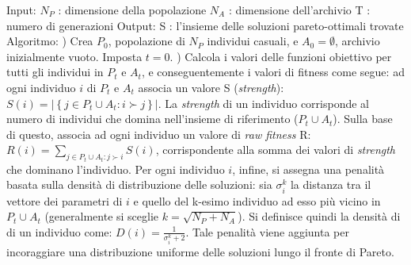 \documentclass[12pt]{article}
\begin{document}
Input: \newline
\tab \tab$ N_P$ : dimensione della popolazione \newline
\tab \tab $N_A$ : dimensione dell'archivio \newline
\tab \tab T : numero di generazioni \newline
\newline
Output: \newline
\tab \tab S : l'insieme delle soluzioni pareto-ottimali trovate \newline
\newline
Algoritmo:\newline
\tab {}) Crea $P_0$, popolazione di $N_P$ individui casuali, e $A_0 = \emptyset$, archivio inizialmente vuoto. Imposta $t = 0$.\newline
\tab {}) Calcola i valori delle funzioni obiettivo per tutti gli individui in $P_t$ e $A_t$, e conseguentemente i valori di fitness come segue: \newline
ad ogni individuo $i$ di $P_t$ e $A_t$ associa un valore S (\textit{strength}): \newline
\newline
 $S(i) = |\left\{ j \in P_t \cup A_t : i \succ j \right\}|$.  \newline 
\newline
La \textit{strength} di un individuo corrisponde al numero di individui che domina nell'insieme di riferimento ($P_t \cup A_t$). Sulla base di questo, associa ad ogni individuo un valore di \textit{raw fitness} R: \newline
\newline
$R(i) = \underset{j \in P_t \cup A_t : j \succ i}{\sum} S(i)$, \newline
\newline
corrispondente alla somma dei valori di \textit{strength} che dominano l'individuo. Per ogni individuo $i$, infine, si assegna una penalità basata sulla densità di distribuzione delle soluzioni: sia $\sigma_i^k$ la distanza tra il vettore dei parametri di $i$ e quello del k-esimo individuo ad esso più vicino in $P_t \cup A_t$ (generalmente si sceglie $k = \sqrt{N_P + N_A}$). Si definisce quindi la densità di di un individuo come:\newline
\newline
$D(i) = \frac{\displaystyle 1}{\displaystyle \sigma_i^k + 2}$.\newline
\newline
Tale penalità viene aggiunta per incoraggiare una distribuzione uniforme delle soluzioni lungo il fronte di Pareto. \newline 
\end{document}
